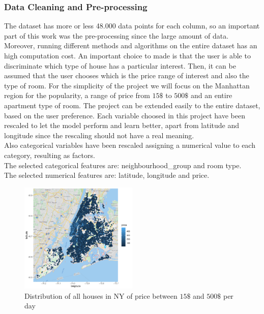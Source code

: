 \documentclass{FR16}
\begin{document}
\subsubsection{Data Cleaning and Pre-processing}
The dataset has more or less 48.000 data points for each column, so an important part of this work was the pre-processing since the large amount of data. Moreover, running different methods and algorithms on the entire dataset has an high computation cost. An important choice to made is that the user is able to discriminate which type of house has a particular interest. Then, it can be assumed that the user chooses which is the price range of interest and also the type of room. For the simplicity of the project we will focus on the Manhattan region for the popularity, a range of price from $15\$$ to $500\$$ and an entire apartment type of room. The project can be extended easily to the entire dataset, based on the user preference. 
Each variable choosed in this project have been rescaled to let the model perform and learn better, apart from latitude and longitude since the rescaling should not have a real meaning.
\\ Also categorical variables have been rescaled assigning a numerical value to each category, resulting as factors. \\
The selected categorical features are: neighbourhood\_group and room type.\\
The selected numerical features are: latitude, longitude and price.
\begin{figure}[H]
\centering
\includegraphics[width=0.5\textwidth]{figures/figure3.pdf} 
\caption{\label{fig:3} Distribution of all houses in NY of price between $15\$$ and $500\$$ per day}
\end{figure}
\end{document}
